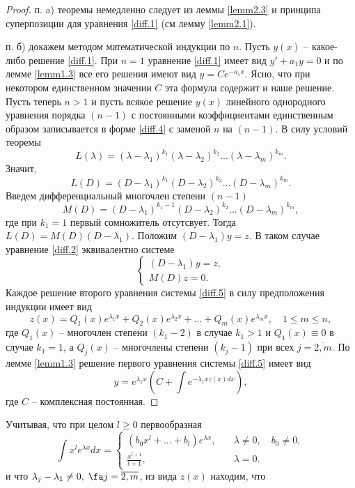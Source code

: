 \begin{proof}

п. a) теоремы немедленно следует из леммы \ref{lemm2.3} и принципа суперпозиции для уравнения \eqref{diff.1} (см лемму \ref{lemm2.1}).

п. б) докажем методом математической индукции по $n$. Пусть $y(x)$ -- какое-либо решение \eqref{diff.1}. При $n=1$ уравнение \eqref{diff.1} имеет вид $y'+a_1y=0$  и по лемме \ref{lemm1.3} все его решения имеют вид $y=Ce^{-a_1x}$. Ясно, что при некотором единственном значении $C$ эта формула содержит и наше решение. Пусть теперь $n>1$  и пусть всякое решение $y(x)$ линейного однородного уравнения порядка $(n-1)$ с постоянными коэффициентами единственным образом записывается в форме \eqref{diff.4} с заменой $n$ на $(n-1)$.
В силу условий теоремы 
$$
L(\lambda)=(\lambda-\lambda_1)^{k_1}(\lambda-\lambda_2)^{k_2}...(\lambda-\lambda_m)^{k_m}.
$$
Значит,
$$
L(D)=(D-\lambda_1)^{k_1}(D-\lambda_2)^{k_2}...(D-\lambda_m)^{k_m}.
$$
Введем дифференциальный многочлен степени $(n-1)$
$$
M(D)=(D-\lambda_1)^{k_1-1}(D-\lambda_2)^{k_2}...(D-\lambda_m)^{k_m},
$$
где при $k_1=1$ первый сомножитель отсутсвует. Тогда $L(D)=M(D)(D-\lambda_1)$. Положим $(D-\lambda_1)y=z$. В таком случае уравнение \eqref{diff.2} эквивалентно системе
\begin{equation}\label{diff.5}
\begin{cases}
(D-\lambda_1)y=z,\\M(D)z=0.
\end{cases}
\end{equation}
Каждое решение второго уравнения системы \eqref{diff.5} в силу предположения индукции имеет вид
$$
z(x)=Q_1(x)e^{\lambda_1x}+Q_2(x)e^{\lambda_2x}+...+Q_m(x)e^{\lambda_mx},\quad 1\leq m\leq n,
$$
где $Q_1(x)$ -- многочлен степени $(k_1-2)$ в случае $k_1>1$ и $Q_1(x)\equiv 0$ в случае $k_1=1$, а $Q_j(x)$ -- многочлены степени $(k_j-1)$ при всех $j=\overline{2,m}$. По лемме \ref{lemm1.3} решение первого уравнения системы \eqref{diff.5} имеет вид
\begin{equation}\label{diff.6}
y=e^{\lambda_1x}\left(C+\int e^{-\lambda_1x z(x) dx}\right),
\end{equation}
где $C$ -- комплексная постоянная.
\end{proof}


Учитывая, что при целом $l\geq 0$ первообразная
$$
\int x^le^{\lambda x}dx = \begin{cases}
(b_0x^l+...+b_l)e^{\lambda x},\quad &\lambda \neq 0,\quad  b_0\neq 0,\\
\frac{x^{l+1}}{l+1},\quad &\lambda=0.
\end{cases}
$$
и что $\lambda_j-\lambda_1\neq 0,\; \fa j=\overline{2,m}$, из вида $z(x)$ находим, что

